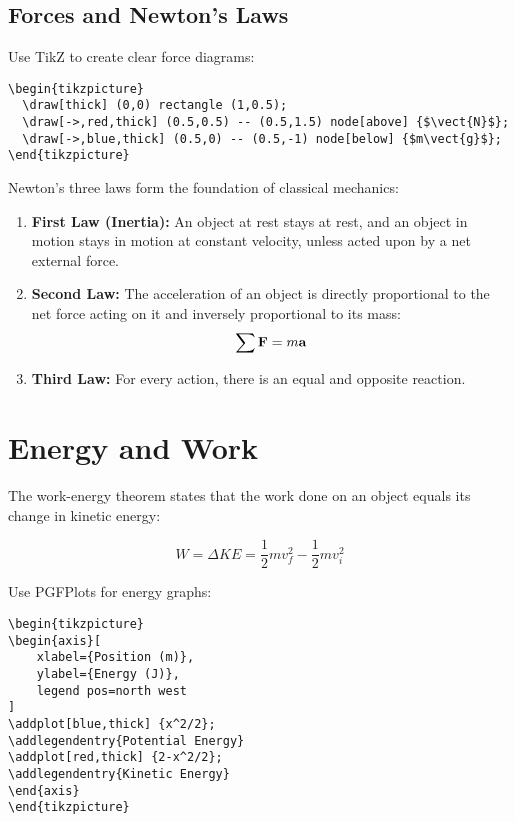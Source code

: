 \documentclass[11pt]{book}
\begin{document}
\section{Forces and Newton's Laws}

\begin{tutorialbox}[title=Creating Force Diagrams with TikZ]
Use TikZ to create clear force diagrams:
\begin{verbatim}
\begin{tikzpicture}
  \draw[thick] (0,0) rectangle (1,0.5);
  \draw[->,red,thick] (0.5,0.5) -- (0.5,1.5) node[above] {$\vect{N}$};
  \draw[->,blue,thick] (0.5,0) -- (0.5,-1) node[below] {$m\vect{g}$};
\end{tikzpicture}
\end{verbatim}
\end{tutorialbox}

Newton's three laws form the foundation of classical mechanics:

\begin{enumerate}
    \item \textbf{First Law (Inertia):} An object at rest stays at rest, and an object in motion stays in motion at constant velocity, unless acted upon by a net external force.
    
    \item \textbf{Second Law:} The acceleration of an object is directly proportional to the net force acting on it and inversely proportional to its mass:
    \[ \sum \mathbf{F} = m\mathbf{a} \]
    
    \item \textbf{Third Law:} For every action, there is an equal and opposite reaction.
\end{enumerate}

\chapter{Energy and Work}

The work-energy theorem states that the work done on an object equals its change in kinetic energy:

\[ W = \Delta KE = \frac{1}{2}mv_f^2 - \frac{1}{2}mv_i^2 \]

\begin{tutorialbox}[title=Creating Energy Diagrams]
Use PGFPlots for energy graphs:
\begin{verbatim}
\begin{tikzpicture}
\begin{axis}[
    xlabel={Position (m)},
    ylabel={Energy (J)},
    legend pos=north west
]
\addplot[blue,thick] {x^2/2};
\addlegendentry{Potential Energy}
\addplot[red,thick] {2-x^2/2};
\addlegendentry{Kinetic Energy}
\end{axis}
\end{tikzpicture}
\end{verbatim}
\end{tutorialbox}
\end{document}
